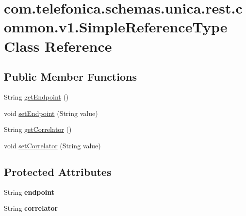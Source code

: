 \hypertarget{classcom_1_1telefonica_1_1schemas_1_1unica_1_1rest_1_1common_1_1v1_1_1SimpleReferenceType}{
\section{com.telefonica.schemas.unica.rest.common.v1.SimpleReferenceType Class Reference}
\label{classcom_1_1telefonica_1_1schemas_1_1unica_1_1rest_1_1common_1_1v1_1_1SimpleReferenceType}
}
\subsection*{Public Member Functions}
\begin{DoxyCompactItemize}
\item 
String \hyperlink{classcom_1_1telefonica_1_1schemas_1_1unica_1_1rest_1_1common_1_1v1_1_1SimpleReferenceType_a833da1d8c7c5fb2ef6d6212e61d5abf7}{getEndpoint} ()
\item 
void \hyperlink{classcom_1_1telefonica_1_1schemas_1_1unica_1_1rest_1_1common_1_1v1_1_1SimpleReferenceType_ae07c210c0a23d28ff36986ba2678fd00}{setEndpoint} (String value)
\item 
String \hyperlink{classcom_1_1telefonica_1_1schemas_1_1unica_1_1rest_1_1common_1_1v1_1_1SimpleReferenceType_a31c03ca81e701659f04517b0ebb01118}{getCorrelator} ()
\item 
void \hyperlink{classcom_1_1telefonica_1_1schemas_1_1unica_1_1rest_1_1common_1_1v1_1_1SimpleReferenceType_a5498439408d059b008d93dcebc33fb62}{setCorrelator} (String value)
\end{DoxyCompactItemize}
\subsection*{Protected Attributes}
\begin{DoxyCompactItemize}
\item 
\hypertarget{classcom_1_1telefonica_1_1schemas_1_1unica_1_1rest_1_1common_1_1v1_1_1SimpleReferenceType_a0d23f3e222cb543d34d42c388510e7da}{
String {\bfseries endpoint}}
\label{classcom_1_1telefonica_1_1schemas_1_1unica_1_1rest_1_1common_1_1v1_1_1SimpleReferenceType_a0d23f3e222cb543d34d42c388510e7da}

\item 
\hypertarget{classcom_1_1telefonica_1_1schemas_1_1unica_1_1rest_1_1common_1_1v1_1_1SimpleReferenceType_ab601b2cfb105a5ab8fd859b58ce5061d}{
String {\bfseries correlator}}
\label{classcom_1_1telefonica_1_1schemas_1_1unica_1_1rest_1_1common_1_1v1_1_1SimpleReferenceType_ab601b2cfb105a5ab8fd859b58ce5061d}

\end{DoxyCompactItemize}


